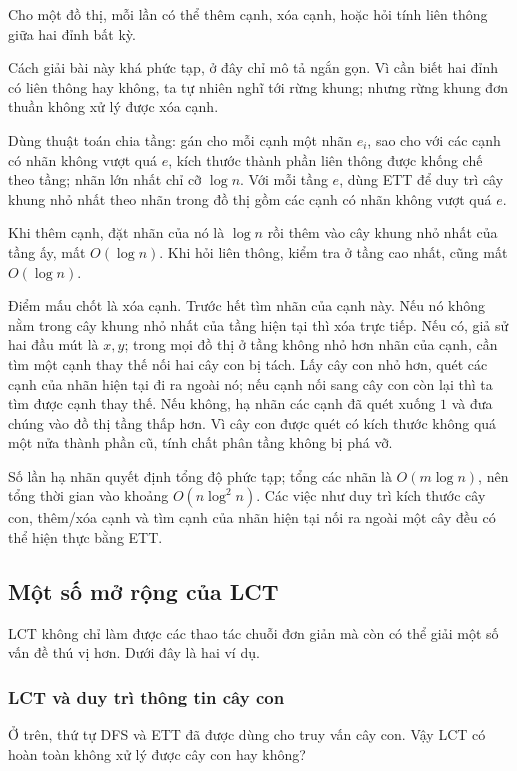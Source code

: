 \documentclass[11pt]{article}
\begin{document}
Cho một đồ thị, mỗi lần có thể thêm cạnh, xóa cạnh, hoặc hỏi tính liên thông giữa
hai đỉnh bất kỳ.

Cách giải bài này khá phức tạp, ở đây chỉ mô tả ngắn gọn. Vì cần biết hai đỉnh
có liên thông hay không, ta tự nhiên nghĩ tới rừng khung; nhưng rừng khung đơn
thuần không xử lý được xóa cạnh.

Dùng thuật toán chia tầng: gán cho mỗi cạnh một nhãn \(e_i\), sao cho với các
cạnh có nhãn không vượt quá \(e\), kích thước thành phần liên thông được khống
chế theo tầng; nhãn lớn nhất chỉ cỡ \(\log n\). Với mỗi tầng \(e\), dùng ETT để
duy trì cây khung nhỏ nhất theo nhãn trong đồ thị gồm các cạnh có nhãn không vượt
quá \(e\).

Khi thêm cạnh, đặt nhãn của nó là \(\log n\) rồi thêm vào cây khung nhỏ nhất của
tầng ấy, mất \(O(\log n)\). Khi hỏi liên thông, kiểm tra ở tầng cao nhất, cũng
mất \(O(\log n)\).

Điểm mấu chốt là xóa cạnh. Trước hết tìm nhãn của cạnh này. Nếu nó không nằm
trong cây khung nhỏ nhất của tầng hiện tại thì xóa trực tiếp. Nếu có, giả sử hai
đầu mút là \(x,y\); trong mọi đồ thị ở tầng không nhỏ hơn nhãn của cạnh, cần tìm
một cạnh thay thế nối hai cây con bị tách. Lấy cây con nhỏ hơn, quét các cạnh
của nhãn hiện tại đi ra ngoài nó; nếu cạnh nối sang cây con còn lại thì ta tìm
được cạnh thay thế. Nếu không, hạ nhãn các cạnh đã quét xuống \(1\) và đưa chúng
vào đồ thị tầng thấp hơn. Vì cây con được quét có kích thước không quá một nửa
thành phần cũ, tính chất phân tầng không bị phá vỡ.

Số lần hạ nhãn quyết định tổng độ phức tạp; tổng các nhãn là \(O(m\log n)\), nên
tổng thời gian vào khoảng \(O(n\log^2 n)\). Các việc như duy trì kích thước cây
con, thêm/xóa cạnh và tìm cạnh của nhãn hiện tại nối ra ngoài một cây đều có thể
hiện thực bằng ETT.

\subsection{Một số mở rộng của LCT}

LCT không chỉ làm được các thao tác chuỗi đơn giản mà còn có thể giải một số vấn
đề thú vị hơn. Dưới đây là hai ví dụ.

\subsubsection{LCT và duy trì thông tin cây con}

Ở trên, thứ tự DFS và ETT đã được dùng cho truy vấn cây con. Vậy LCT có hoàn
toàn không xử lý được cây con hay không?
\end{document}
